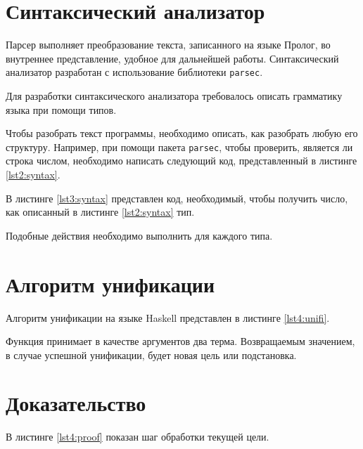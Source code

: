 
\section{Синтаксический анализатор}
Парсер выполняет преобразование текста, записанного на языке Пролог, во внутреннее представление, удобное для дальнейшей работы. Синтаксический анализатор разработан с использование библиотеки \texttt{parsec}.

Для разработки синтаксического анализатора требовалось описать грамматику языка при помощи типов.



Чтобы разобрать текст программы, необходимо описать, как разобрать любую его структуру. Например, при помощи пакета \texttt{parsec}, чтобы проверить, является ли строка числом, необходимо написать следующий код, представленный в листинге \ref{lst2:syntax}.



В листинге \ref{lst3:syntax} представлен код, необходимый, чтобы получить число, как описанный в листинге \ref{lst2:syntax} тип.



Подобные действия необходимо выполнить для каждого типа.

\section{Алгоритм унификации}
Алгоритм унификации на языке Haskell представлен в листинге \ref{lst4:unifi}.


Функция принимает в качестве аргументов два терма. Возвращаемым значением, в случае успешной унификации, будет новая цель или подстановка.

\section{Доказательство}
В листинге \ref{lst4:proof} показан шаг обработки текущей цели.


